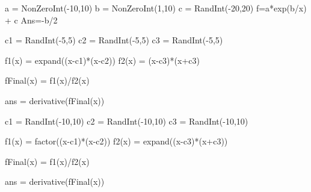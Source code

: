 \begin{sagesilent}
a = NonZeroInt(-10,10)
b = NonZeroInt(1,10)
c = RandInt(-20,20)
f=a*exp(b/x) + c
Ans=-b/2
\end{sagesilent}



\begin{sagesilent}

c1 = RandInt(-5,5)
c2 = RandInt(-5,5)
c3 = RandInt(-5,5)

f1(x) = expand((x-c1)*(x-c2))
f2(x) = (x-c3)*(x+c3)

fFinal(x) = f1(x)/f2(x)

ans = derivative(fFinal(x))

\end{sagesilent}



\begin{sagesilent}

c1 = RandInt(-10,10)
c2 = RandInt(-10,10)
c3 = RandInt(-10,10)

f1(x) = factor((x-c1)*(x-c2))
f2(x) = expand((x-c3)*(x+c3))

fFinal(x) = f1(x)/f2(x)

ans = derivative(fFinal(x))

\end{sagesilent}

